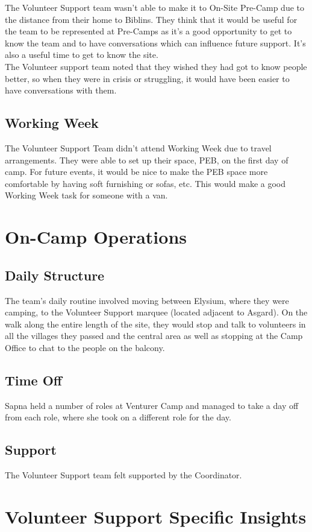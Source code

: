 The Volunteer Support team wasn't able to make it to On-Site Pre-Camp due to the distance from their home to Biblins. They think that it would be useful for the team to be represented at Pre-Camps as it's a good opportunity to get to know the team and to have conversations which can influence future support. It's also a useful time to get to know the site.\\

The Volunteer support team noted that they wished they had got to know people better, so when they were in crisis or struggling, it would have been easier to have conversations with them.

\subsection{Working Week}
The Volunteer Support Team didn't attend Working Week due to travel arrangements. They were able to set up their space, PEB, on the first day of camp. For future events, it would be nice to make the PEB space more comfortable by having soft furnishing or sofas, etc. This would make a good Working Week task for someone with a van.

\section{On-Camp Operations}
\subsection{Daily Structure}
The team's daily routine involved moving between Elysium, where they were camping, to the Volunteer Support marquee (located adjacent to Asgard). On the walk along the entire length of the site, they would stop and talk to volunteers in all the villages they passed and the central area as well as stopping at the Camp Office to chat to the people on the balcony. 
\subsection{Time Off}
Sapna held a number of roles at Venturer Camp and managed to take a day off from each role, where she took on a different role for the day. 
\subsection{Support}
The Volunteer Support team felt supported by the Coordinator. 

\section{Volunteer Support Specific Insights}
